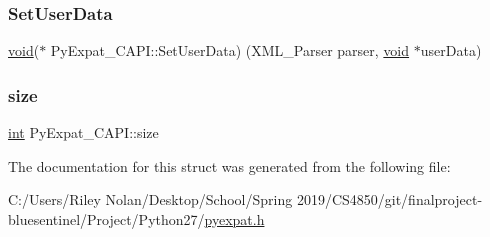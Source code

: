 \mbox{\label{struct_py_expat___c_a_p_i_a43b5bc9b3ec3772d9edb2295e9a54489}} 
\subsubsection{\texorpdfstring{SetUserData}{SetUserData}}
{\footnotesize\ttfamily \mbox{\hyperlink{_s_d_l__opengles2__gl2ext_8h_ae5d8fa23ad07c48bb609509eae494c95}{void}}($\ast$ Py\+Expat\+\_\+\+C\+A\+P\+I\+::\+Set\+User\+Data) (X\+M\+L\+\_\+\+Parser parser, \mbox{\hyperlink{_s_d_l__opengles2__gl2ext_8h_ae5d8fa23ad07c48bb609509eae494c95}{void}} $\ast$user\+Data)}

\mbox{\label{struct_py_expat___c_a_p_i_af92677867a91271e628f211a96c9b5df}} 
\subsubsection{\texorpdfstring{size}{size}}
{\footnotesize\ttfamily \mbox{\hyperlink{warnings_8h_a74f207b5aa4ba51c3a2ad59b219a423b}{int}} Py\+Expat\+\_\+\+C\+A\+P\+I\+::size}



The documentation for this struct was generated from the following file\+:\begin{DoxyCompactItemize}
\item 
C\+:/\+Users/\+Riley Nolan/\+Desktop/\+School/\+Spring 2019/\+C\+S4850/git/finalproject-\/bluesentinel/\+Project/\+Python27/\mbox{\hyperlink{pyexpat_8h}{pyexpat.\+h}}\end{DoxyCompactItemize}
